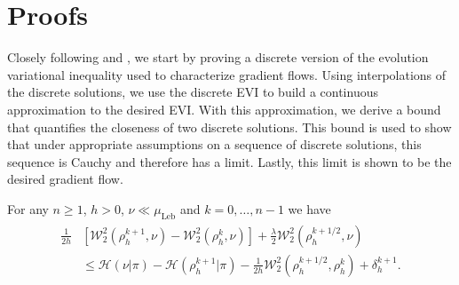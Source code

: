 \documentclass[final,12pt]{colt2018}
\newcommand{\was}{\mathcal{W}}
\begin{document}







\appendix

\section{Proofs}\label{appendix:proofs}
Closely following \citet{clement2011trotter} and \citet{ambrosio2005}, we start by proving a discrete version of the evolution variational inequality used to characterize gradient flows. Using interpolations of the discrete solutions, we use the discrete EVI to build a continuous approximation to the desired EVI. With this approximation, we derive a bound that quantifies the closeness of two discrete solutions. This bound is used to show that under appropriate assumptions on a sequence of discrete solutions, this sequence is Cauchy and therefore has a limit. Lastly, this limit is shown to be the desired gradient flow. 

\begin{lemma}\label{lemma:Discrete Evolution Variation Inequality}
For any $n\geq 1$, $h >0$, $\nu  \ll \mu_{\text{Leb}}$ and $k = 0, \dots, n-1$ we have
\begin{align}
\begin{split}
\frac{1}{2h}&\left[ \was_2^2(\rho_{h}^{k+1},\nu) - \was_2^2(\rho_{h}^{k},\nu) \right] +\frac{\lambda}{2}\was_2^2(\rho_h^{k+1/2},\nu) \\
&\leq \mathcal{H}(\nu | \pi) - \mathcal{H}(\rho_{h}^{k+1} | \pi) - \frac{1}{2h}\was_2^2(\rho_{h}^{k+1/2},\rho_{h}^{k}) + \delta_{h}^{k+1}.
\end{split}
\end{align}
\end{lemma}
\end{document}
